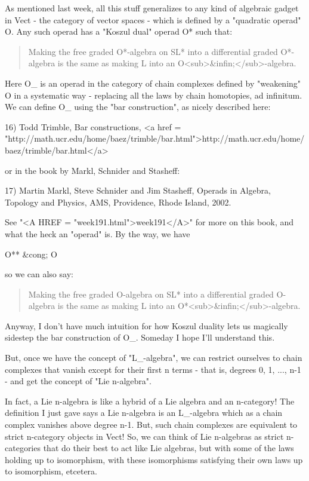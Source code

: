 As mentioned last week, all this stuff generalizes to any kind of
algebraic gadget in Vect - the category of vector spaces - which is
defined by a "quadratic operad" O.  Any such operad has a
"Koszul dual" operad O* such that:

\begin{quote}
 Making the free graded O*-algebra on SL* into a differential
 graded O*-algebra is the same as making L into an O<sub>&infin;</sub>-algebra.
\end{quote}
    

Here O_{\infty } is an operad in the category of chain complexes
defined by "weakening" O in a systematic way - replacing all the
laws by chain homotopies, ad infinitum.  We can define O_{\infty }
using the "bar construction", as nicely described here:

16) Todd Trimble, Bar constructions,
<a href = "http://math.ucr.edu/home/baez/trimble/bar.html">http://math.ucr.edu/home/baez/trimble/bar.html</a>

or in the book by Markl, Schnider and Stasheff:

17) Martin Markl, Steve Schnider and Jim Stasheff, Operads in 
Algebra, Topology and Physics, AMS, Providence, Rhode Island, 2002.

See "<A HREF = "week191.html">week191</A>" for more on this
book, and what the heck an "operad" is.  By the way, we have

O** &cong; O

so we can also say:

\begin{quote}
 Making the free graded O-algebra on SL* into a differential
 graded O-algebra is the same as making L into an O*<sub>&infin;</sub>-algebra.
\end{quote}
    



Anyway, I don't have much intuition for how Koszul duality lets
us magically sidestep the bar construction of O_{\infty }. Someday
I hope I'll understand this.

But, once we have the concept of "L_{\infty }-algebra", 
we can restrict ourselves to chain complexes that
vanish except for their first n terms - that is, degrees 0, 1, ...,
n-1 - and get the concept of "Lie n-algebra".

In fact, a Lie n-algebra is like a hybrid of a Lie algebra and an
n-category!  The definition I just gave says a Lie n-algebra is 
an L_{\infty }-algebra which as a chain complex vanishes above 
degree n-1.  But, such chain complexes are equivalent to strict 
n-category objects in Vect!  So, we can think of Lie n-algebras as 
strict n-categories that do their best to act like Lie algebras, but 
with some of the laws holding up to isomorphism, with these isomorphisms 
satisfying their own laws up to isomorphism, etcetera.  

